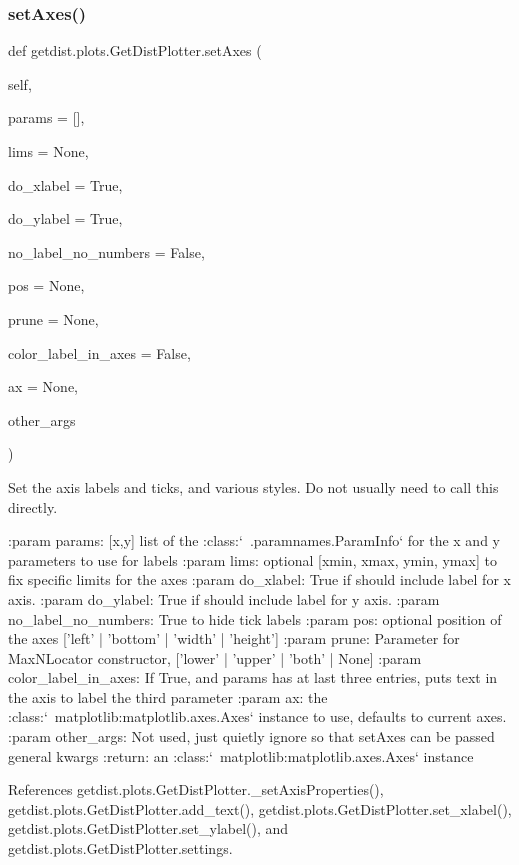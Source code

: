 \subsubsection{\texorpdfstring{set\+Axes()}{setAxes()}}
{\footnotesize\ttfamily def getdist.\+plots.\+Get\+Dist\+Plotter.\+set\+Axes (\begin{DoxyParamCaption}\item[{}]{self,  }\item[{}]{params = {\ttfamily \mbox{[}\mbox{]}},  }\item[{}]{lims = {\ttfamily None},  }\item[{}]{do\+\_\+xlabel = {\ttfamily True},  }\item[{}]{do\+\_\+ylabel = {\ttfamily True},  }\item[{}]{no\+\_\+label\+\_\+no\+\_\+numbers = {\ttfamily False},  }\item[{}]{pos = {\ttfamily None},  }\item[{}]{prune = {\ttfamily None},  }\item[{}]{color\+\_\+label\+\_\+in\+\_\+axes = {\ttfamily False},  }\item[{}]{ax = {\ttfamily None},  }\item[{}]{other\+\_\+args }\end{DoxyParamCaption})}

\begin{DoxyVerb}Set the axis labels and ticks, and various styles. Do not usually need to call this directly.

:param params: [x,y] list of the :class:`~.paramnames.ParamInfo` for the x and y parameters to use for labels
:param lims: optional [xmin, xmax, ymin, ymax] to fix specific limits for the axes
:param do_xlabel: True if should include label for x axis.
:param do_ylabel: True if should include label for y axis.
:param no_label_no_numbers: True to hide tick labels
:param pos: optional position of the axes ['left' | 'bottom' | 'width' | 'height']
:param prune: Parameter for MaxNLocator constructor,  ['lower' | 'upper' | 'both' | None]
:param color_label_in_axes: If True, and params has at last three entries, puts text in the axis to label the third parameter
:param ax: the :class:`~matplotlib:matplotlib.axes.Axes` instance to use, defaults to current axes.
:param other_args: Not used, just quietly ignore so that setAxes can be passed general kwargs
:return: an :class:`~matplotlib:matplotlib.axes.Axes` instance
\end{DoxyVerb}
 

References getdist.\+plots.\+Get\+Dist\+Plotter.\+\_\+set\+Axis\+Properties(), getdist.\+plots.\+Get\+Dist\+Plotter.\+add\+\_\+text(), getdist.\+plots.\+Get\+Dist\+Plotter.\+set\+\_\+xlabel(), getdist.\+plots.\+Get\+Dist\+Plotter.\+set\+\_\+ylabel(), and getdist.\+plots.\+Get\+Dist\+Plotter.\+settings.



